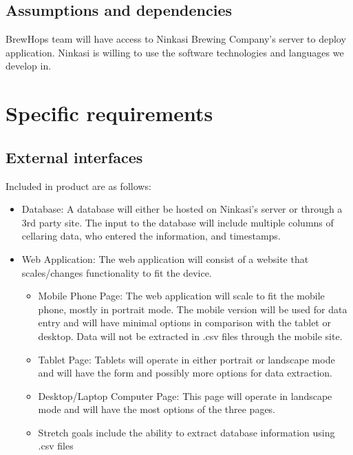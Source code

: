 \documentclass[draftclsnofoot,onecolumn,letterpaper,10pt,compsoc]{IEEEtran}
\begin{document}
	\subsection{Assumptions and dependencies}
    BrewHops team will have access to Ninkasi Brewing Company's server to deploy application.
    Ninkasi is willing to use the software technologies and languages we develop in.

\section{Specific requirements}
	\subsection{External interfaces}
    Included in product are as follows:
        \begin{itemize}
				\item{Database: A database will either be hosted on Ninkasi's server or through a 3rd party site.
                The input to the database will include multiple columns of cellaring data, who entered the information, and timestamps. }

            \item{Web Application:}
            The web application will consist of a website that scales/changes functionality to fit the device.

                \begin{itemize}
				    \item{Mobile Phone Page: The web application will scale to fit the mobile phone, mostly in portrait mode.
					The mobile version will be used for data entry and will have minimal options in comparison with the tablet or desktop.
				    Data will not be extracted in .csv files through the mobile site.}

                    \item{Tablet Page: Tablets will operate in either portrait or landscape mode and will have the form and possibly more options for data extraction.}

                    \item{Desktop/Laptop Computer Page: This page will operate in landscape mode and will have the most options of the three pages.}

                    \item{Stretch goals include the ability to extract database information using .csv files}
                \end{itemize}
        \end{itemize}
\end{document}
